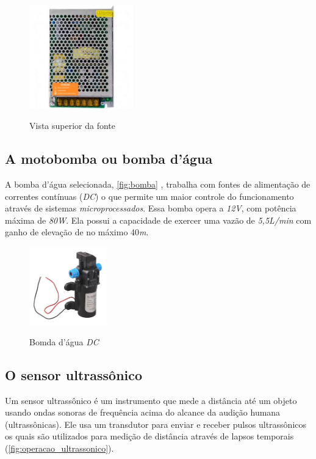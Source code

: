 \begin{figure}[H]
	\centering
	\caption{Vista superior da fonte}
	\includegraphics[width=0.4\textwidth]{figuras/fonte_chaveada.jpg}
	\label{fig:fontechaveada}
\end{figure} 

\subsection{A motobomba ou bomba d'água}

A bomba d'água selecionada, \autoref{fig:bomba} , trabalha com fontes de alimentação de correntes contínuas (\textit{DC}) o que permite um maior controle do funcionamento através de sistemas \textit{microprocessados}. Essa bomba opera a \textit{12V}, com potência máxima de \textit{80W}. Ela possui a capacidade de exercer uma vazão de \textit{5,5L/min} com ganho de elevação de no máximo 40\textit{m}.

\begin{figure}[H]
	\centering
	\caption{Bomda d'água \textit{DC}}
	\includegraphics[width=0.3\textwidth]{figuras/bomba.jpeg}
	\label{fig:bomba}
\end{figure}

\subsection{O sensor ultrassônico}
\label{ssec:sensor_ultra}

Um sensor ultrassônico é um instrumento que mede a distância até um objeto usando ondas sonoras de frequência acima do alcance da audição humana (ultrassônicas). Ele usa um transdutor para enviar e receber pulsos ultrassônicos os quais são utilizados para medição de distância através de lapsos temporais (\autoref{fig:operacao_ultrassonico}).

